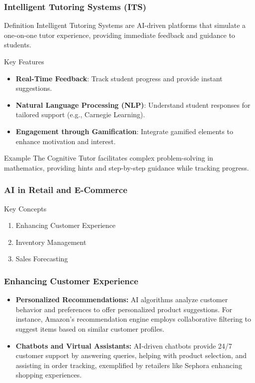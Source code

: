 \documentclass[aspectratio=169]{beamer}
\begin{document}
\begin{frame}[fragile]
    \frametitle{Intelligent Tutoring Systems (ITS)}
    
    \begin{block}{Definition}
        Intelligent Tutoring Systems are AI-driven platforms that simulate a one-on-one tutor experience, providing immediate feedback and guidance to students.
    \end{block}
    
    \begin{block}{Key Features}
        \begin{itemize}
            \item \textbf{Real-Time Feedback}: Track student progress and provide instant suggestions.
            \item \textbf{Natural Language Processing (NLP)}: Understand student responses for tailored support (e.g., Carnegie Learning).
            \item \textbf{Engagement through Gamification}: Integrate gamified elements to enhance motivation and interest.
        \end{itemize}
    \end{block}
    
    \begin{block}{Example}
        The Cognitive Tutor facilitates complex problem-solving in mathematics, providing hints and step-by-step guidance while tracking progress.
    \end{block}
\end{frame}

\begin{frame}[fragile]
    \frametitle{AI in Retail and E-Commerce}
    \begin{block}{Key Concepts}
        \begin{enumerate}
            \item Enhancing Customer Experience
            \item Inventory Management
            \item Sales Forecasting
        \end{enumerate}
    \end{block}
\end{frame}

\begin{frame}[fragile]
    \frametitle{Enhancing Customer Experience}
    \begin{itemize}
        \item \textbf{Personalized Recommendations:}
        AI algorithms analyze customer behavior and preferences to offer personalized product suggestions. For instance, Amazon's recommendation engine employs collaborative filtering to suggest items based on similar customer profiles.
        
        \item \textbf{Chatbots and Virtual Assistants:}
        AI-driven chatbots provide 24/7 customer support by answering queries, helping with product selection, and assisting in order tracking, exemplified by retailers like Sephora enhancing shopping experiences.
    \end{itemize}
\end{frame}
\end{document}
